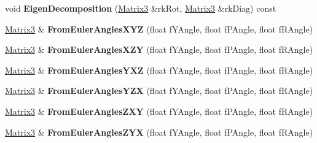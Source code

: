 \begin{DoxyCompactItemize}
\item 
void {\bfseries Eigen\+Decomposition} (\hyperlink{class_i_dream_sky_1_1_matrix3}{Matrix3} \&rk\+Rot, \hyperlink{class_i_dream_sky_1_1_matrix3}{Matrix3} \&rk\+Diag) const \hypertarget{class_i_dream_sky_1_1_matrix3_a2dccc8da559f4692c01d793552700bb9}{}\label{class_i_dream_sky_1_1_matrix3_a2dccc8da559f4692c01d793552700bb9}

\item 
\hyperlink{class_i_dream_sky_1_1_matrix3}{Matrix3} \& {\bfseries From\+Euler\+Angles\+X\+YZ} (float f\+Y\+Angle, float f\+P\+Angle, float f\+R\+Angle)\hypertarget{class_i_dream_sky_1_1_matrix3_a1d74c17fe0abf80870b4dafb1bf55cd2}{}\label{class_i_dream_sky_1_1_matrix3_a1d74c17fe0abf80870b4dafb1bf55cd2}

\item 
\hyperlink{class_i_dream_sky_1_1_matrix3}{Matrix3} \& {\bfseries From\+Euler\+Angles\+X\+ZY} (float f\+Y\+Angle, float f\+P\+Angle, float f\+R\+Angle)\hypertarget{class_i_dream_sky_1_1_matrix3_ae2d6ddc3ff7912c896801e4552c10318}{}\label{class_i_dream_sky_1_1_matrix3_ae2d6ddc3ff7912c896801e4552c10318}

\item 
\hyperlink{class_i_dream_sky_1_1_matrix3}{Matrix3} \& {\bfseries From\+Euler\+Angles\+Y\+XZ} (float f\+Y\+Angle, float f\+P\+Angle, float f\+R\+Angle)\hypertarget{class_i_dream_sky_1_1_matrix3_a2f0c617823bb2c126bd868d6e143ae42}{}\label{class_i_dream_sky_1_1_matrix3_a2f0c617823bb2c126bd868d6e143ae42}

\item 
\hyperlink{class_i_dream_sky_1_1_matrix3}{Matrix3} \& {\bfseries From\+Euler\+Angles\+Y\+ZX} (float f\+Y\+Angle, float f\+P\+Angle, float f\+R\+Angle)\hypertarget{class_i_dream_sky_1_1_matrix3_ae2f084f022de248b1c2ca1e8cf4ae11b}{}\label{class_i_dream_sky_1_1_matrix3_ae2f084f022de248b1c2ca1e8cf4ae11b}

\item 
\hyperlink{class_i_dream_sky_1_1_matrix3}{Matrix3} \& {\bfseries From\+Euler\+Angles\+Z\+XY} (float f\+Y\+Angle, float f\+P\+Angle, float f\+R\+Angle)\hypertarget{class_i_dream_sky_1_1_matrix3_a8f55d7dc305ae6313b17ffcb99938931}{}\label{class_i_dream_sky_1_1_matrix3_a8f55d7dc305ae6313b17ffcb99938931}

\item 
\hyperlink{class_i_dream_sky_1_1_matrix3}{Matrix3} \& {\bfseries From\+Euler\+Angles\+Z\+YX} (float f\+Y\+Angle, float f\+P\+Angle, float f\+R\+Angle)\hypertarget{class_i_dream_sky_1_1_matrix3_ae5c499f1e5800a068fe8d0995352ab72}{}\label{class_i_dream_sky_1_1_matrix3_ae5c499f1e5800a068fe8d0995352ab72}


\end{DoxyCompactItemize}
